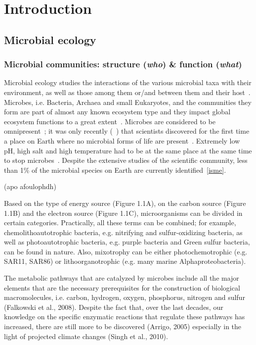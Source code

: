 \chapter{Introduction}
\label{cha:intro}


\section{Microbial ecology}

   \subsection{Microbial communities: structure (\textit{who}) \& function (\textit{what})}

      Microbial ecology studies the interactions of the various microbial taxa with their environment, 
      as well as those among them or/and between them and their host~\cite{isme}.
      Microbes, i.e. Bacteria, Archaea and small Eukaryotes, 
      and the communities they form are part of almost any known ecosystem type 
      and they impact global ecosystem functions to a great extent~\citep{falkowski2008microbial}.
      Microbes are considered to be omnipresent~\citep{falkowski2008microbial}; 
      it was only recently (~\citeyear{belilla2019hyperdiverse}) that scientists discovered for the first time 
      a place on Earth where no microbial forms of life are present~\cite{belilla2019hyperdiverse}.
      Extremely low pH, high salt and high temperature had to be 
      at the same place at the same time to stop microbes~\citep{belilla2019hyperdiverse}.
      Despite the extensive studies of the scientific community, 
      less than 1\% of the microbial species on Earth are currently identified~\ref{isme}.

      (apo afoulophdh)

      Based on the type of energy source (Figure 1.1A), on the carbon source (Figure 1.1B)
      and the electron source (Figure 1.1C), microorganisms can be divided in certain
      categories. Practically, all these terms can be combined; for example,
      chemolithoautotrophic bacteria, e.g. nitrifying and sulfur-oxidizing bacteria, as well
      as photoautotrophic bacteria, e.g. purple bacteria and Green sulfur bacteria, can be
      found in nature. Also, mixotrophy can be either photochemotrophic (e.g. SAR11,
      SAR86) or lithoorganotrophic (e.g. many marine Alphaproteobacteria).


      The metabolic pathways that are catalyzed by microbes include all the major
      elements that are the necessary prerequisites for the construction of biological
      macromolecules, i.e. carbon, hydrogen, oxygen, phosphorus, nitrogen and sulfur
      (Falkowski et al., 2008). Despite the fact that, over the last decades, our knowledge
      on the specific enzymatic reactions that regulate these pathways has increased,
      there are still more to be discovered (Arrigo, 2005) especially in the light of projected
      climate changes (Singh et al., 2010).





